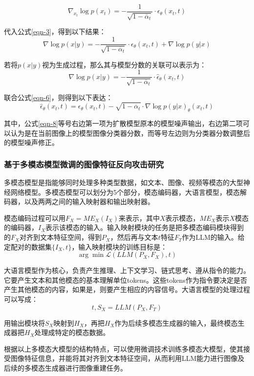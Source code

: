 \begin{equation}\label{eqn-5}
      \nabla_{x_t} \log p(x_t) = - \frac{1}{\sqrt{1-\overline{\alpha}_t}} \cdot\epsilon_\theta(x_t,t)
\end{equation}
\par
代入公式\eqref{eqn-3}，得到以下结果：
\begin{equation}\label{eqn-6}
      \nabla \log p(x|y) = - \frac{1}{\sqrt{1-\overline{\alpha}_t}} \cdot\epsilon_\theta(x_t,t)
      + \nabla \log p(y|x)
\end{equation}
\par
若将$p(x|y)$视为生成过程，那么其与模型分数的关联可以表示为：
\begin{equation}\label{eqn-7}
      \nabla \log p(x|y) = - \frac{1}{\sqrt{1-\overline{\alpha}_t}} \cdot\hat{\epsilon}_\theta(x_t,t)
\end{equation}
\par
联合公式\eqref{eqn-6}，则得到以下表达：
\begin{equation}\label{eqn-8}
      \hat{\epsilon}_\theta(x_t,t) = \epsilon_\theta(x_t,t) -\sqrt{1-\overline{\alpha}_t} \cdot \nabla \log p(y|x)_\theta(x_t,t)
\end{equation}
\par
其中，公式\eqref{eqn-8}等号右边第一项为扩散模型原本的模型噪声输出，右边第二项可以认为是在当前图像上的模型图像分类器分数，而等号左边则为分类器分数调整后的模型噪声修正。
\subsubsection{基于多模态模型微调的图像特征反向攻击研究}
多模态模型是指能够同时处理多种类型数据，如文本、图像、视频等模态的大型神经网络模型。多模态模型可以划分为5个部分，模态编码器，大语言模型，模态解码器，以及两两之间的输入映射器和输出映射器。
\par
模态编码过程可以用$F_X = ME_X(I_X)$来表示，其中$X$表示模态，$ME_X$表示$X$模态的编码器，$I_X$表示该模态的输入。输入映射模块的任务是把多模态编码模块得到的$F_X$对齐到文本特征空间，得到$P_X$，然后再与文本$t$特征$F_T$作为LLM的输入。给定配对的数据集$\{I_X,t\}$，输入映射模块的训练目标是：
\begin{equation}\label{eqn-9}
      \arg \min \mathcal{L}(LLM(P_X,F_X),t)
\end{equation}
\par
大语言模型作为核心，负责产生推理、上下文学习、链式思考、遵从指令的能力。它要产生文本和其他模态的基本理解单位tokens。这些tokens作为指令要决定是否产生其他模态的内容，如果是，则要产生相应的内容信号。大语言模型的处理过程可以写成：
\begin{equation}\label{eqn-10}
      t,S_X = LLM(P_X,F_T)
\end{equation}
\par
用输出模块将$S_X$映射到$H_X$，再把$H_X$作为后续多模态生成器的输入，最终模态生成器把$H_X$处理成特定的模态数据。
\par
根据以上多模态大模型的结构特点，可以使用微调技术训练多模态大模型，使其接受图像特征信息，并能将其对齐到文本特征空间，从而利用LLM能力进行图像及后续的多模态生成器进行图像重建任务。

